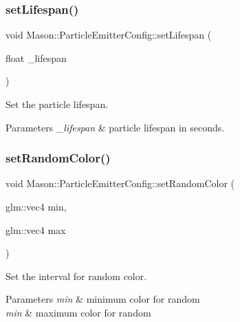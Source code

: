 \subsubsection{\texorpdfstring{set\+Lifespan()}{setLifespan()}}
{\footnotesize\ttfamily void Mason\+::\+Particle\+Emitter\+Config\+::set\+Lifespan (\begin{DoxyParamCaption}\item[{float}]{\+\_\+lifespan }\end{DoxyParamCaption})\hspace{0.3cm}{\ttfamily [inline]}}



Set the particle lifespan. 


\begin{DoxyParams}{Parameters}
{\em \+\_\+lifespan} & particle lifespan in seconds. \\
\hline
\end{DoxyParams}
\hypertarget{struct_mason_1_1_particle_emitter_config_a5317af2f90691360678a2663a747c36d}{}\label{struct_mason_1_1_particle_emitter_config_a5317af2f90691360678a2663a747c36d} 
\subsubsection{\texorpdfstring{set\+Random\+Color()}{setRandomColor()}}
{\footnotesize\ttfamily void Mason\+::\+Particle\+Emitter\+Config\+::set\+Random\+Color (\begin{DoxyParamCaption}\item[{glm\+::vec4}]{min,  }\item[{glm\+::vec4}]{max }\end{DoxyParamCaption})\hspace{0.3cm}{\ttfamily [inline]}}



Set the interval for random color. 


\begin{DoxyParams}{Parameters}
{\em min} & minimum color for random \\
\hline
{\em min} & maximum color for random \\
\hline
\end{DoxyParams}
\hypertarget{struct_mason_1_1_particle_emitter_config_a463adb67fe4ee1732daa20e9d01d2331}{}\label{struct_mason_1_1_particle_emitter_config_a463adb67fe4ee1732daa20e9d01d2331} 
